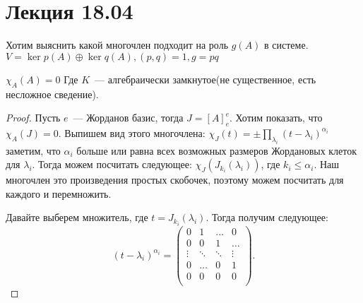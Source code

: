 \section{Лекция 18.04}
\begin{motivation}
    Хотим выяснить какой многочлен подходит на роль $g(A)$ в системе.
    $V = \ker p(A) \oplus \ker q(A), (p,q) = 1, g= pq$
\end{motivation}
\begin{theorem}
   $\chi_A(A) = 0$
   Где $K$~--- алгебраически замкнутое(не существенное, есть несложное сведение).
\end{theorem}
\begin{proof}
    Пусть $e$~--- Жорданов базис, тогда $J = [A]^e_e$.
    Хотим показать, что $\chi_A(J) = 0$.
    Выпишем вид этого многочлена: $\chi_J(t) = \pm\prod\limits_{\lambda_i}^{}{(t-\lambda_i)^{\alpha_i}}$
    заметим, что $\alpha_i$ больше или равна всех возможных размеров Жордановых клеток 
    для $\lambda_i$.
    Тогда можем посчитать следующее:
    $\chi_J(J_{k_i}(\lambda_i))$, где $k_i \le \alpha_i$.
    Наш многочлен это произведения простых скобочек, поэтому можем посчитать для
    каждого и перемножить. 

    Давайте выберем множитель, где $t= J_{k_i}(\lambda_i)$.
    Тогда получим следующее:
     \[
         (t - \lambda_i)^{\alpha_i}  = 
         \begin{pmatrix}
             0 & 1 & \dots & 0\\
             0 & 0 & 1 & \dots\\
             \vdots & \ddots & \ddots & \vdots\\
             0 & \dots & 0 & 1\\
             0 & 0 & 0 & 0\\
         \end{pmatrix}
    .\] 
\end{proof}

